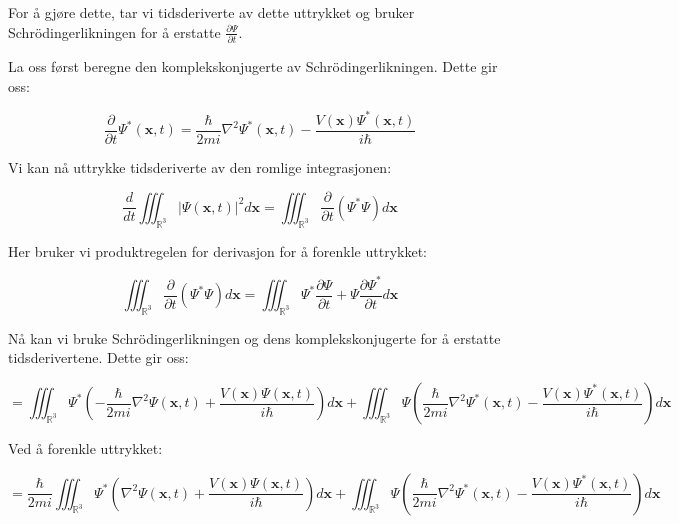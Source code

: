 For å gjøre dette, tar vi tidsderiverte av dette uttrykket og bruker Schrödingerlikningen for å erstatte $\frac{\partial \Psi}{\partial t}$.

La oss først beregne den komplekskonjugerte av Schrödingerlikningen. Dette gir oss:

\begin{equation*}
    \frac{\partial}{\partial t}\Psi^*(\mathbf{x},t) = \frac{\hbar}{2mi}\nabla^2\Psi^*(\mathbf{x},t) - \frac{V(\mathbf{x})\Psi^*(\mathbf{x},t)}{i\hbar}
\end{equation*}

Vi kan nå uttrykke tidsderiverte av den romlige integrasjonen:

\begin{equation*}
    \frac{d}{dt} \iiint_{\mathbb{R}^{3}}|\Psi(\mathbf{x}, t)|^{2} d\mathbf{x} = \iiint_{\mathbb{R}^{3}} \frac{\partial}{\partial t} (\Psi^* \Psi) d\mathbf{x}
\end{equation*}

Her bruker vi produktregelen for derivasjon for å forenkle uttrykket:

\begin{equation*}
    \iiint_{\mathbb{R}^{3}} \frac{\partial}{\partial t} \left(\Psi^* \Psi \right) d\mathbf{x} = \iiint_{\mathbb{R}^{3}} \Psi^* \frac{\partial \Psi}{\partial t} + \Psi \frac{\partial \Psi^*}{\partial t} d\mathbf{x}
\end{equation*}

Nå kan vi bruke Schrödingerlikningen og dens komplekskonjugerte for å erstatte tidsderivertene. Dette gir oss:

\begin{equation*}
    = \iiint_{\mathbb{R}^{3}} \Psi^* \left(-\frac{\hbar}{2mi}\nabla^2\Psi(\mathbf{x},t) + \frac{V(\mathbf{x})\Psi(\mathbf{x},t)}{i\hbar}\right) d\mathbf{x} + \iiint_{\mathbb{R}^{3}} \Psi \left(\frac{\hbar}{2mi}\nabla^2\Psi^*(\mathbf{x},t) - \frac{V(\mathbf{x})\Psi^*(\mathbf{x},t)}{i\hbar}\right) d\mathbf{x}
\end{equation*}

Ved å forenkle uttrykket: 

\begin{equation*}
    =\frac{\hbar}{2mi} \iiint_{\mathbb{R}^{3}} \Psi^* \left(\nabla^2\Psi(\mathbf{x},t) + \frac{V(\mathbf{x})\Psi(\mathbf{x},t)}{i\hbar}\right) d\mathbf{x} + \iiint_{\mathbb{R}^{3}} \Psi \left(\frac{\hbar}{2mi}\nabla^2\Psi^*(\mathbf{x},t) - \frac{V(\mathbf{x})\Psi^*(\mathbf{x},t)}{i\hbar}\right) d\mathbf{x}
\end{equation*}

